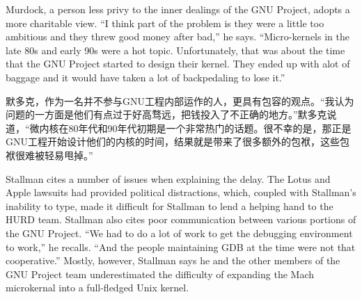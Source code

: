 \ifdefined\eng
Murdock, a person less privy to the inner dealings of the GNU Project, adopts a more charitable view. ``I think part of the problem is they were a little too ambitious and they threw good money after bad,'' he says. ``Micro-kernels in the late 80s and early 90s were a hot topic. Unfortunately, that was about the time that the GNU Project started to design their kernel. They ended up with alot of baggage and it would have taken a lot of backpedaling to lose it.''
\fi

\ifdefined\chs
默多克，作为一名并不参与GNU工程内部运作的人，更具有包容的观点。``我认为问题的一方面是他们有点过于好高骛远，把钱投入了不正确的地方。''默多克说道，``微内核在80年代和90年代初期是一个非常热门的话题。很不幸的是，那正是GNU工程开始设计他们的内核的时间，结果就是带来了很多额外的包袱，这些包袱很难被轻易甩掉。''
\fi




\ifdefined\eng
Stallman cites a number of issues when explaining the delay. The Lotus and Apple lawsuits had provided political distractions, which, coupled with Stallman's inability to type, made it difficult for Stallman to lend a helping hand to the HURD team. Stallman also cites poor communication between various portions of the GNU Project. ``We had to do a lot of work to get the debugging environment to work,'' he recalls. ``And the people maintaining GDB at the time were not that cooperative.'' Mostly, however, Stallman says he and the other members of the GNU Project team underestimated the difficulty of expanding the Mach microkernal into a full-fledged Unix kernel.
\fi

